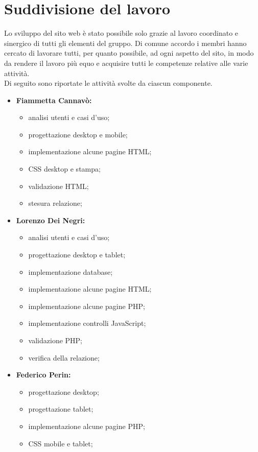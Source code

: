 \section{Suddivisione del lavoro}
\label{suddivisione-del-lavoro}
Lo sviluppo del sito web è stato possibile solo grazie al lavoro coordinato e sinergico di tutti gli elementi del gruppo. Di comune accordo i membri hanno cercato di lavorare tutti, per quanto possibile, ad ogni aspetto del sito, in modo da rendere il lavoro più equo e acquisire tutti le competenze relative alle varie attività. 
\\Di seguito sono riportate le attività svolte da ciascun componente.  
\begin{itemize}
	\item \textbf{Fiammetta Cannavò:}
		\begin{itemize}
			\item analisi utenti e casi d'uso;
			\item progettazione desktop e mobile;
			\item implementazione alcune pagine HTML;
			\item CSS desktop e stampa;
			\item validazione HTML;
			\item stesura relazione;
		\end{itemize}
	\item \textbf{Lorenzo Dei Negri:}
		\begin{itemize}
			\item analisi utenti e casi d'uso;
			\item progettazione desktop e tablet;
			\item implementazione database;
			\item implementazione alcune pagine HTML;
			\item implementazione alcune pagine PHP;
			\item implementazione controlli JavaScript;
			\item validazione PHP;
			\item verifica della relazione;
		\end{itemize}
	\item \textbf{Federico Perin:}
		\begin{itemize}
			\item progettazione desktop;
			\item progettazione tablet;
			\item implementazione alcune pagine PHP;
			\item CSS mobile e tablet;

\end{itemize}
\end{itemize}
